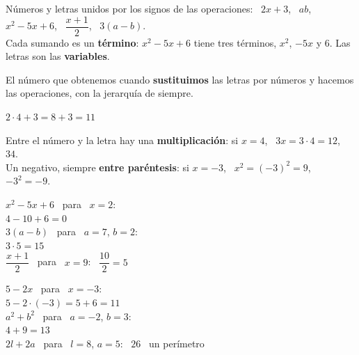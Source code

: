 \documentclass[11pt,a4paper]{article}
\newcommand{\comic}{\fontfamily{ComicNeue-TLF}\selectfont}
\newcommand{\nota}[1]{{\comic\small\color{fmex!85!black}#1}}
\newcommand{\mal}[1]{{\color{fmR}\faTimesCircle}\ {\color{fmR}\ensuremath{#1}}}
\begin{document}
\vfill
\begin{idea}
Números y letras unidos por los signos de las operaciones: \ $2x+3$, \ $ab$, \ $x^2-5x+6$, \ $\dfrac{x+1}{2}$, \ $3(a-b)$.\\[3pt]
Cada sumando es un \textbf{término}: $x^2-5x+6$ tiene tres términos, $x^2$, $-5x$ y $6$. Las letras son las \textbf{variables}.
\end{idea}

\vfill
\begin{minipage}[c]{0.52\linewidth}
\begin{idea}
El número que obtenemos cuando \textbf{sustituimos} las letras por números y hacemos las operaciones, con la jerarquía de siempre.
\end{idea}
\end{minipage}\hfill
\begin{minipage}[c]{0.45\linewidth}
\begin{exemple}[Ejemplo: \ $2x+3$ \ para \ $x=4$]
$2\cdot4+3=8+3=\boxed{11}$
\end{exemple}
\end{minipage}

\vfill
\begin{compte}
Entre el número y la letra hay una \textbf{multiplicación}: si $x=4$, \ $3x=3\cdot4=12$, \ \mal{34}.\\[3pt]
Un negativo, siempre \textbf{entre paréntesis}: si $x=-3$, \ $x^2=(-3)^2=9$, \ \mal{-3^2=-9}.
\end{compte}

\vfill
\begin{exemple}[Ejemplos]
\begin{minipage}[t]{0.48\linewidth}
$x^2-5x+6$ \ para \ $x=2$:\\ $4-10+6=\boxed{0}$\\[4pt]
$3(a-b)$ \ para \ $a=7$, $b=2$:\\ $3\cdot5=\boxed{15}$\\[4pt]
$\dfrac{x+1}{2}$ \ para \ $x=9$: \ $\dfrac{10}{2}=\boxed{5}$
\end{minipage}\hfill
\begin{minipage}[t]{0.49\linewidth}
$5-2x$ \ para \ $x=-3$:\\ $5-2\cdot(-3)=5+6=\boxed{11}$\\[4pt]
$a^2+b^2$ \ para \ $a=-2$, $b=3$:\\ $4+9=\boxed{13}$\\[4pt]
$2l+2a$ \ para \ $l=8$, $a=5$: \ $\boxed{26}$ \ \nota{un perímetro}
\end{minipage}
\end{exemple}
\end{document}
